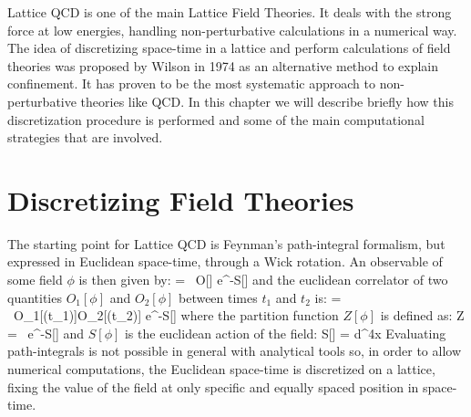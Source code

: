 
Lattice QCD is one of the main Lattice Field Theories. It deals with the strong force at low energies, handling non-perturbative calculations in a numerical way. The idea of discretizing space-time in a lattice and perform calculations of field theories was proposed by Wilson in 1974 \cite{wilson_confinement_1974} as an alternative method to explain confinement. It has proven to be the most systematic approach to non-perturbative theories like QCD. In this chapter we will describe briefly how this discretization procedure is performed and some of the main computational strategies that are involved.

\section{Discretizing Field Theories}

The starting point for Lattice QCD is Feynman's path-integral formalism, but expressed in Euclidean space-time, through a Wick rotation. An observable of some field $\phi$ is then given by:
\beq
     =  \int \D[\phi] ~O[\phi] e^{-S[\phi]}
    \label{lattice:obs_base}
    \eeq
    and the euclidean correlator of two quantities $O_1[\phi]$ and $O_2[\phi]$ between times $t_1$ and $t_2$ is:
    \beq
     =  \int \D[\phi] ~O_1[\phi(t_1)]O_2[\phi(t_2)] e^{-S[\phi]}
    \label{lattice:correlator}
\eeq
where the partition function $Z[\phi]$ is defined as:
\beq
	Z = \int \D[\phi] ~e^{-S[\phi]} 
\eeq
and $S[\phi]$ is the euclidean action of the field:
\beq
S[\phi] = \int d^4x \Lagr [\phi] 
\eeq
Evaluating path-integrals is not possible in general with analytical tools so, in order to allow numerical computations, the Euclidean space-time is discretized on a lattice, fixing the value of the field at only specific and equally spaced position in space-time. 



